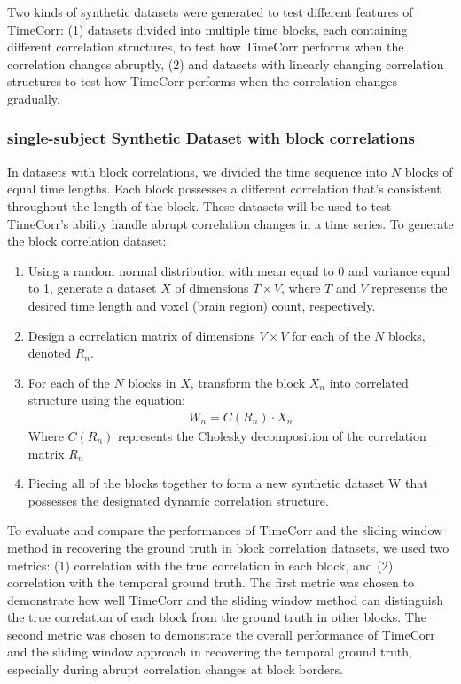 \documentclass[11pt]{article}
\begin{document}
Two kinds of synthetic datasets were generated to test different features of TimeCorr: (1) datasets divided into multiple time blocks, each containing different correlation structures, to test how TimeCorr performs when the correlation changes abruptly, (2) and datasets with linearly changing correlation structures to test how TimeCorr performs when the correlation changes gradually.

\subsubsection{single-subject Synthetic Dataset with block correlations}

In datasets with block correlations, we divided the time sequence into $N$ blocks of equal time lengths. Each block possesses a different correlation that's consistent throughout the length of the block. These datasets will be used to test TimeCorr's ability handle abrupt correlation changes in a time series. To generate the block correlation dataset:
\begin{enumerate}
\item Using a random normal distribution with mean equal to 0 and variance equal to 1, generate a dataset $X$ of dimensions $T\times V$, where $T$ and $V$ represents the desired time length and voxel (brain region) count, respectively.
\item Design a correlation matrix of dimensions $V\times V$ for each of the $N$ blocks, denoted $R_n$.
\item For each of the $N$ blocks in $X$, transform the block $X_n$ into correlated structure using the equation:
\begin{align*}
W_n = C(R_n) \cdot X_n
\end{align*}
Where $C(R_n)$ represents the Cholesky decomposition of the correlation matrix $R_n$
\item Piecing all of the blocks together to form a new synthetic dataset W that possesses the designated dynamic correlation structure.
\end{enumerate}

To evaluate and compare the performances of TimeCorr and the sliding window method in recovering the ground truth in block correlation datasets, we used two metrics: (1) correlation with the true correlation in each block, and (2) correlation with the temporal ground truth. The first metric was chosen to demonstrate how well TimeCorr and the sliding window method can distinguish the true correlation of each block from the ground truth in other blocks. The second metric was chosen to demonstrate the overall performance of TimeCorr and the sliding window approach in recovering the temporal ground truth, especially during abrupt correlation changes at block borders.
\end{document}
